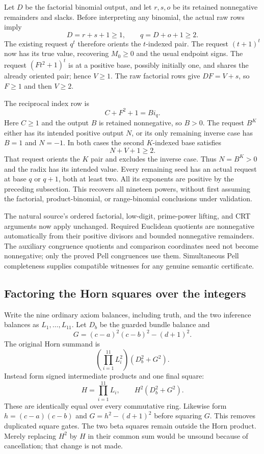 Let $D$ be the factorial binomial output, and let $r,s,o$ be its retained
nonnegative remainders and slacks.  Before interpreting any binomial,
the actual raw rows imply
\[
 D=r+s+1\ge1,\qquad q=D+o+1\ge2.
\]
The existing request $q^t$ therefore orients the $t$-indexed pair.  The
request $(t+1)^t$ now has its true value, recovering $M_0\ge0$ and the
usual endpoint signs.  The request $(Ft^2+1)^t$ is at a positive base,
possibly initially one, and shares the already oriented pair; hence
$V\ge1$.  The raw factorial rows give $DF=V+s$, so $F\ge1$ and then
$V\ge2$.

The reciprocal index row is
\[
 C+F^2+1=B i_q.
\]
Here $C\ge1$ and the output $B$ is retained nonnegative, so $B>0$.
The request $B^K$ either has its intended positive output $N$, or its
only remaining inverse case has $B=1$ and $N=-1$.  In both cases the
second $K$-indexed base satisfies
\[
 N+V+1\ge2.
\]
That request orients the $K$ pair and excludes the inverse case.  Thus
$N=B^K>0$ and the radix has its intended value.  Every remaining seed
has an actual request at base $q$ or $q+1$, both at least two.  All its
exponents are positive by the preceding subsection.  This recovers all
nineteen powers, without first assuming the factorial, product-binomial,
or range-binomial conclusions under validation.

The natural source's ordered factorial, low-digit, prime-power lifting,
and CRT arguments now apply unchanged.  Required Euclidean quotients
are nonnegative automatically from their positive divisors and bounded
nonnegative remainders.  The auxiliary congruence quotients and comparison
coordinates need not become nonnegative; only the proved Pell congruences
use them.  Simultaneous Pell completeness supplies compatible witnesses
for any genuine semantic certificate.

\subsection{Factoring the Horn squares over the integers}

Write the nine ordinary axiom balances, including truth, and the two
inference balances as $L_1,\ldots,L_{11}$.  Let $D_b$ be the guarded
bundle balance and
\[
 G=(c-a)^2(c-b)^2-(d+1)^2.
\]
The original Horn summand is
\[
 \left(\prod_{i=1}^{11}L_i^2\right)(D_b^2+G^2).
\]
Instead form signed intermediate products and one final square:
\[
 H=\prod_{i=1}^{11}L_i,
 \qquad H^2(D_b^2+G^2).
\]
These are identically equal over every commutative ring.  Likewise form
$h=(c-a)(c-b)$ and $G=h^2-(d+1)^2$ before squaring $G$.
This removes duplicated square gates.  The two beta squares remain
outside the Horn product.  Merely replacing $H^2$ by $H$ in their common
sum would be unsound because of cancellation; that change is not made.

